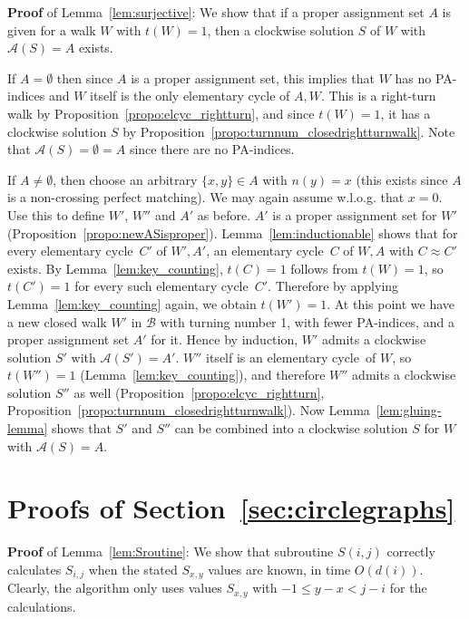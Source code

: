 \documentclass{llncs}
\newcommand{\QED}{\hspace*{\fill}{$\Box$}\medskip}
\newcommand{\BW}{\mathcal{B}}
\newcommand{\AS}{\mathcal{A}}
\newcommand{\elcyc}{elementary cycle}
\begin{document}
\medskip


{\bf Proof} of Lemma~\ref{lem:surjective}:
We show that if a proper assignment set $A$ is given for a walk $W$ with $t(W)=1$, then a clockwise solution $S$ of $W$ with $\AS(S)=A$ exists.

If $A=\emptyset$ then since $A$ is a proper assignment set, this implies that $W$ has no PA-indices and $W$ itself is the only elementary cycle of $A,W$. 
This is a right-turn walk by Proposition~\ref{propo:elcyc_rightturn}, and since $t(W)=1$, it has a clockwise solution $S$ by Proposition~\ref{propo:turnnum_closedrightturnwalk}. Note that $\AS(S)=\emptyset=A$ since there are no PA-indices.



If $A\not=\emptyset$, then choose an arbitrary $\{x,y\}\in A$ with $n(y)=x$ (this exists since $A$ is a non-crossing perfect matching). We may again assume w.l.o.g. that $x=0$.
Use this to define $W'$, $W''$ and $A'$ as before.
$A'$ is a proper assignment set for $W'$ (Proposition~\ref{propo:newASisproper}).
Lemma~\ref{lem:inductionable} shows that for every \elcyc\ $C'$ of $W',A'$, an \elcyc\ $C$ of $W,A$ with $C\approx C'$ exists. By Lemma~\ref{lem:key_counting}, $t(C)=1$ follows from $t(W)=1$, so $t(C')=1$ for every such \elcyc\ $C'$. 
Therefore by applying Lemma~\ref{lem:key_counting} again, we obtain $t(W')=1$. 
At this point we have a new closed walk $W'$ in $\BW$ with turning number 1, with fewer PA-indices, and a proper assignment set $A'$ for it. Hence by induction, $W'$ admits a clockwise solution $S'$ with $\AS(S')=A'$.
$W''$ itself is an \elcyc\ of $W$, so $t(W'')=1$ (Lemma~\ref{lem:key_counting}), and therefore $W''$ admits a clockwise solution $S''$ as well (Proposition~\ref{propo:elcyc_rightturn}, Proposition~\ref{propo:turnnum_closedrightturnwalk}). 
Now Lemma~\ref{lem:gluing-lemma} shows that $S'$ and $S''$ can be combined into a clockwise solution $S$ for $W$ with $\AS(S)=A$.
\QED



\section{Proofs of Section~\ref{sec:circlegraphs}}

{\bf Proof} of Lemma~\ref{lem:Sroutine}:
We show that subroutine $S(i,j)$ correctly calculates $S_{i,j}$ when the stated $S_{x,y}$ values are known, in time $O(d(i))$.
Clearly, the algorithm only uses values $S_{x,y}$ with $-1\leq y-x<j-i$ for the calculations.
\end{document}
